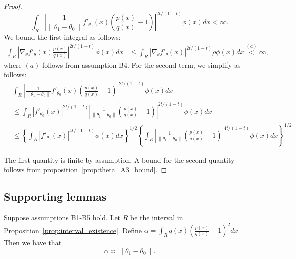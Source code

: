 \documentclass{article}
\begin{document}
\begin{proof}
\[         \int_R \left| \frac{1}{\| \theta_1 - \theta_0\|} f'_{\theta_0}(x) \left( \frac{p(x)}{q(x)} - 1 \right)  \right|^{2t/(1-t)} \phi(x)dx < \infty.
\]
We bound the first integral as follows:
\begin{align*}
 \int_R \left|  \nabla_{\theta} f'_{\bar{\theta}}(x) \frac{p(x)}{q(x)} \right|^{2t/(1-t)} \phi(x) dx &\leq 
            \int_R \left|  \nabla_{\theta} f'_{\bar{\theta}}(x) \right|^{2t/(1-t)} \rho \phi(x) dx  \stackrel{(a)}< \infty,
\end{align*}
where $(a)$ follows from assumption B4.  For the second term, we simplify as follows:
\begin{align*}
&  \int_R \left| \frac{1}{\| \theta_1 - \theta_0\|} f'_{\theta_0}(x) \left( \frac{p(x)}{q(x)} - 1 \right)  \right|^{2t/(1-t)} \phi(x)dx \\
    &\leq \int_R | f'_{\theta_0}(x) |^{2t/(1-t)}
             \left|  \frac{1}{\| \theta_1 - \theta_0\|}  \left( \frac{p(x)}{q(x)} - 1 \right)  \right|^{2t/(1-t)} \phi(x) dx \\
    &\leq \left\{ \int_R  | f'_{\theta_0}(x) |^{4t/(1-t)} \phi(x) dx \right\}^{1/2} 
         \left\{
            \int_R
             \left| \frac{1}{\| \theta_1 - \theta_0\|}  \left( \frac{p(x)}{q(x)} - 1 \right)  \right|^{4t/(1-t)} \phi(x) dx 
         \right\}^{1/2} 
\end{align*}

The first quantity is finite by assumption. A bound for the second quantity follows from proposition~\ref{prop:theta_A3_bound}.
\end{proof}



\subsection{Supporting lemmas}

\begin{lemma}
\label{lem:chi_square_theta_equivalence}
Suppose assumptions B1-B5 hold. Let $R$ be the interval in Proposition~\ref{prop:interval_existence}. Define $\alpha = \int_R q(x) \left( \frac{p(x)}{q(x)} - 1 \right)^2 dx$. Then we have that
\[
\alpha \asymp \| \theta_1 - \theta_0 \|.
\]
\end{lemma}
\end{document}
